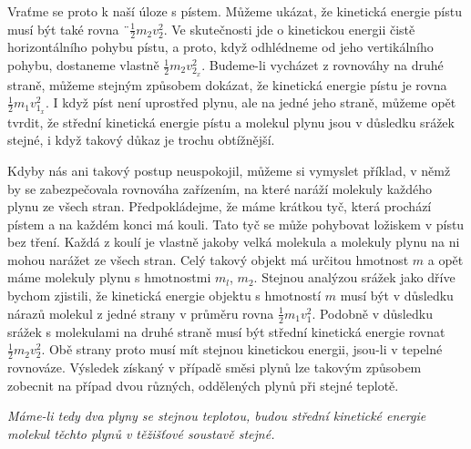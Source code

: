     Vraťme se proto k naší úloze s pístem. Můžeme ukázat, že kinetická energie pístu musí být také
    rovna ¨\(\frac{1}{2}m_2v^2_2\). Ve skutečnosti jde o kinetickou energii čistě horizontálního
    pohybu pístu, a proto, když odhlédneme od jeho vertikálního pohybu, dostaneme vlastně
    \(\frac{1}{2}m_2v^2_{2_x}\). Budeme-li vycházet z rovnováhy na druhé straně, můžeme stejným
    způsobem dokázat, že kinetická energie pístu je rovna \(\frac{1}{2}m_1v^2_{1_x}\). I když píst
    není uprostřed plynu, ale na jedné jeho straně, můžeme opět tvrdit, že střední kinetická energie
    pístu a molekul plynu jsou v důsledku srážek stejné, i když takový důkaz je trochu obtížnější.

    Kdyby nás ani takový postup neuspokojil, můžeme si vymyslet příklad, v němž by se zabezpečovala
    rovnováha zařízením, na které naráží molekuly každého plynu ze všech stran. Předpokládejme, že
    máme krátkou tyč, která prochází pístem a na každém konci má kouli. Tato tyč se může pohybovat
    ložiskem v pístu bez tření. Každá z koulí je vlastně jakoby velká molekula a molekuly plynu na
    ni mohou narážet ze všech stran. Celý takový objekt má určitou hmotnost \(m\) a opět máme
    molekuly plynu s hmotnostmi \(m_l\), \(m_2\). Stejnou analýzou srážek jako dříve bychom
    zjistili, že kinetická energie objektu s hmotností \(m\) musí být v důsledku nárazů molekul z
    jedné strany v průměru rovna \(\frac{1}{2}m_1v^2_1\). Podobně v důsledku srážek s molekulami na
    druhé straně musí být střední kinetická energie rovnat \(\frac{1}{2}m_2v^2_2\). Obě strany proto
    musí mít stejnou kinetickou energii, jsou-li v tepelné rovnováze. Výsledek získaný v případě
    směsi plynů lze takovým způsobem zobecnit na případ dvou různých, oddělených plynů při stejné
    teplotě.

    \emph{Máme-li tedy dva plyny se stejnou teplotou, budou střední kinetické energie molekul těchto
    plynů v těžišťové soustavě stejné.}

